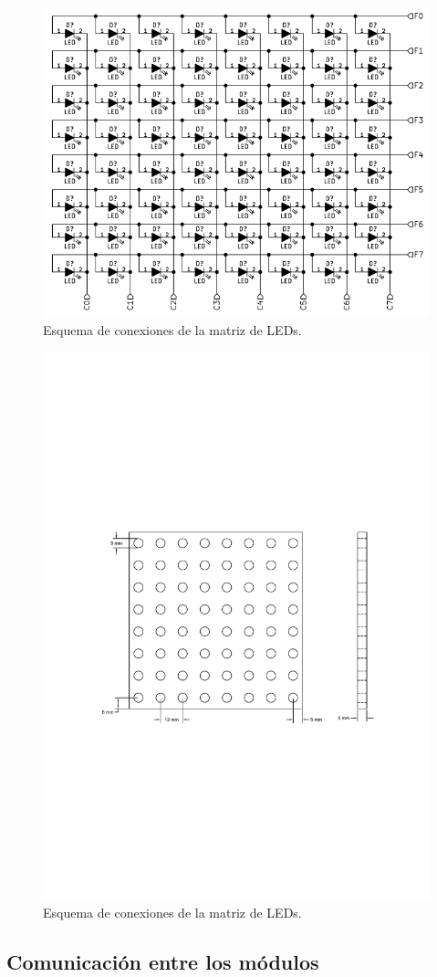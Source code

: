 \begin{figure}[!ht]
	\centering
	\includegraphics[width=0.7\linewidth]{imagenes/hw/modulo-led.pdf}
	\caption{Esquema de conexiones de la matriz de LEDs.}
	\label{fig:modulo-led}
\end{figure}
\begin{figure}[!ht]
	\centering
	\includegraphics[width=0.7\linewidth]{imagenes/hw/modulo-led-dimensiones.pdf}
	\caption{Esquema de conexiones de la matriz de LEDs.}
	\label{fig:modulo-led}
\end{figure}


\subsection{Comunicación entre los módulos}

